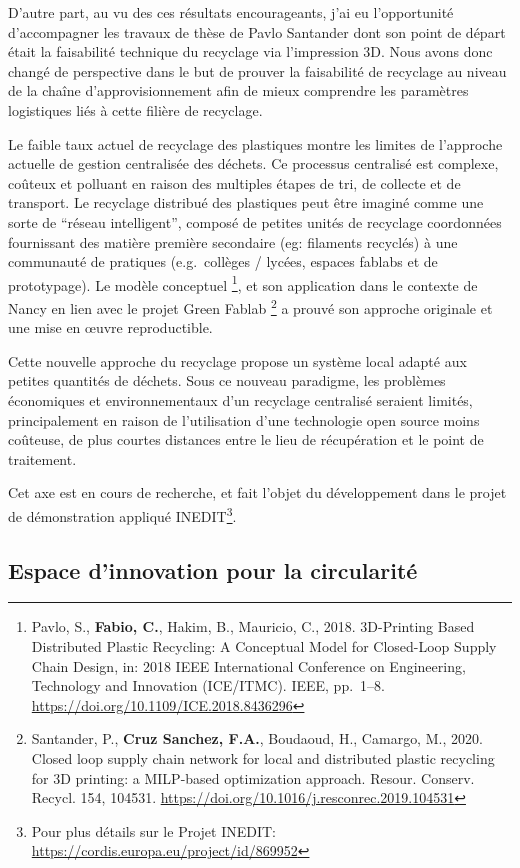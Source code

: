 \documentclass[
  12pt,
  oneside]{book}
\begin{document}
D'autre part, au vu des ces résultats encourageants, j'ai eu l'opportunité d'accompagner les travaux de thèse de Pavlo Santander dont son point de départ était la faisabilité technique du recyclage via l'impression 3D.
Nous avons donc changé de perspective dans le but de prouver la faisabilité de recyclage au niveau de la chaîne d'approvisionnement afin de mieux comprendre les paramètres logistiques liés à cette filière de recyclage.

Le faible taux actuel de recyclage des plastiques montre les limites de l'approche actuelle de gestion centralisée des déchets. Ce processus centralisé est complexe, coûteux et polluant en raison des multiples étapes de tri, de collecte et de transport. Le recyclage distribué des plastiques peut être imaginé comme une sorte de ``réseau intelligent'', composé de petites unités de recyclage coordonnées fournissant des matière première secondaire (eg: filaments recyclés) à une communauté de pratiques (e.g.~collèges / lycées, espaces fablabs et de prototypage). Le modèle conceptuel \footnote{Pavlo, S., \textbf{Fabio, C.}, Hakim, B., Mauricio, C., 2018. 3D-Printing Based Distributed Plastic Recycling: A Conceptual Model for Closed-Loop Supply Chain Design, in: 2018 IEEE International Conference on Engineering, Technology and Innovation (ICE/ITMC). IEEE, pp.~1--8. \url{https://doi.org/10.1109/ICE.2018.8436296}}, et son application dans le contexte de Nancy en lien avec le projet Green Fablab \footnote{Santander, P., \textbf{Cruz Sanchez, F.A.}, Boudaoud, H., Camargo, M., 2020. Closed loop supply chain network for local and distributed plastic recycling for 3D printing: a MILP-based optimization approach. Resour. Conserv. Recycl. 154, 104531. \url{https://doi.org/10.1016/j.resconrec.2019.104531}} a prouvé son approche originale et une mise en œuvre reproductible.

Cette nouvelle approche du recyclage propose un système local adapté aux petites quantités de déchets. Sous ce nouveau paradigme, les problèmes économiques et environnementaux d'un recyclage centralisé seraient limités, principalement en raison de l'utilisation d'une technologie open source moins coûteuse, de plus courtes distances entre le lieu de récupération et le point de traitement.

Cet axe est en cours de recherche, et fait l'objet du développement dans le projet de démonstration appliqué INEDIT\footnote{Pour plus détails sur le Projet INEDIT: \url{https://cordis.europa.eu/project/id/869952}}.

\hypertarget{espace-dinnovation-pour-la-circularituxe9}{%
\subsection{Espace d'innovation pour la circularité}\label{espace-dinnovation-pour-la-circularituxe9}}
\end{document}
